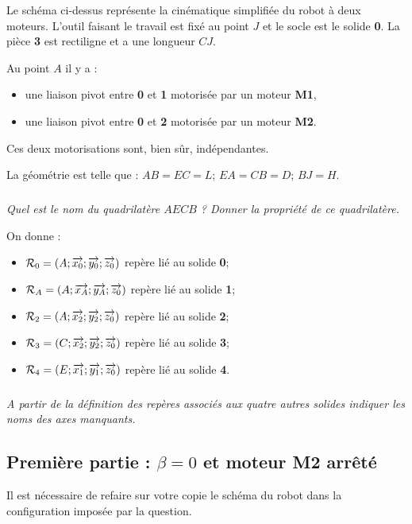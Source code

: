 \documentclass[10pt,oneside]{article}
\begin{document}
\vspace{.25cm}

Le schéma ci-dessus représente la cinématique simplifiée du robot à deux moteurs. L'outil faisant le travail est fixé au point $J$ et le socle est le solide \textbf{0}. La pièce \textbf{3} est rectiligne et a une longueur $CJ$. 

Au point $A$ il y a :
\begin{itemize}
\item une liaison pivot entre \textbf{0} et \textbf{1} motorisée par un moteur \textbf{M1},
\item une liaison pivot entre \textbf{0} et \textbf{2} motorisée par un moteur \textbf{M2}.
\end{itemize}

Ces deux motorisations sont, bien sûr, indépendantes.

La géométrie est telle que : $AB=EC=L$; $EA=CB=D$; $BJ=H$.

\subparagraph{}
\textit{Quel est le nom du quadrilatère $AECB$ ? Donner la propriété de ce quadrilatère.}

On donne :
\begin{itemize}
\item $\mathcal{R}_0=\left(A;\overrightarrow{x_0};\overrightarrow{y_0};\overrightarrow{z_0}\right)$ repère lié au solide \textbf{0};
\item $\mathcal{R}_A=\left(A;\overrightarrow{x_A};\overrightarrow{y_A};\overrightarrow{z_0}\right)$ repère lié au solide \textbf{1};
\item $\mathcal{R}_2=\left(A;\overrightarrow{x_2};\overrightarrow{y_2};\overrightarrow{z_0}\right)$ repère lié au solide \textbf{2};
\item $\mathcal{R}_3=\left(C;\overrightarrow{x_2};\overrightarrow{y_2};\overrightarrow{z_0}\right)$ repère lié au solide \textbf{3};
\item $\mathcal{R}_4=\left(E;\overrightarrow{x_1};\overrightarrow{y_1};\overrightarrow{z_0}\right)$ repère lié au solide \textbf{4}.
\end{itemize}

\subparagraph{}
\textit{A partir de la définition des repères associés aux quatre autres solides indiquer les noms des axes manquants.}

\subsection*{Première partie : $\beta=0$ et moteur M2 arrêté}
\begin{rem}
Il est nécessaire de refaire sur votre copie le schéma du robot  dans la configuration imposée par la question.
\end{rem}
\end{document}
